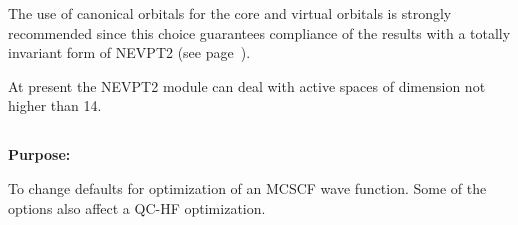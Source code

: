
The use of canonical orbitals for the core and virtual orbitals is
strongly recommended since this choice guarantees compliance of the
results with a totally invariant form of NEVPT2 (see page~\pageref{ch:nevpt2}).

At present the NEVPT2 module can deal with active spaces of dimension
not higher than 14.

\pagebreak[3]
\subsection{\label{ref-optinp}}

{\bf Purpose:}

To change defaults for optimization of an MCSCF wave function.
Some of the options also affect a QC-HF optimization.

